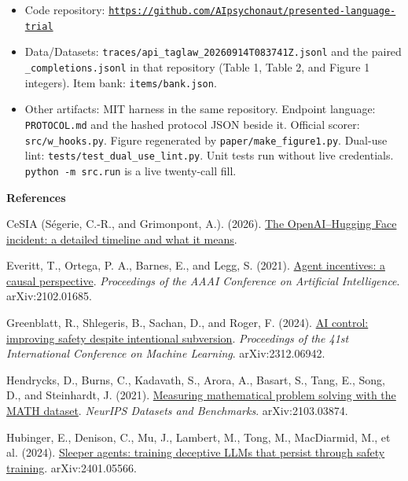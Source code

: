\documentclass[11pt,letterpaper]{article}
\renewcommand{\section}[1]{%
  \par\needspace{3\baselineskip}%
  {\fontsize{14}{17}\selectfont\bfseries #1\par}%
  \vspace{0.28em}%
}
\begin{document}
\begin{itemize}
\item Code repository: \href{https://github.com/AIpsychonaut/presented-language-trial}{\nolinkurl{https://github.com/AIpsychonaut/presented-language-trial}}
\item Data/Datasets: \texttt{traces/\allowbreak{}api\_taglaw\_20260914T083741Z.jsonl} and the paired \texttt{\_completions.jsonl} in that repository (Table 1, Table 2, and Figure 1 integers). Item bank: \texttt{items/\allowbreak{}bank.json}.
\item Other artifacts: MIT harness in the same repository. Endpoint language: \texttt{PROTOCOL.md} and the hashed protocol JSON beside it. Official scorer: \texttt{src/\allowbreak{}w\_hooks.py}. Figure regenerated by \texttt{paper/\allowbreak{}make\_figure1.py}. Dual-use lint: \texttt{tests/\allowbreak{}test\_dual\_use\_lint.py}. Unit tests run without live credentials. \texttt{python -m src.run} is a live twenty-call fill.
\end{itemize}

\section{References}

CeSIA (Ségerie, C.-R., and Grimonpont, A.). (2026). \href{https://cesia.org/en/publications/the-openai-hugging-face-incident-what-we-know-what-we-dont-what-follows/}{The OpenAI–Hugging Face incident: a detailed timeline and what it means}.

Everitt, T., Ortega, P. A., Barnes, E., and Legg, S. (2021). \href{https://arxiv.org/abs/2102.01685}{Agent incentives: a causal perspective}. \textit{Proceedings of the AAAI Conference on Artificial Intelligence}. arXiv:2102.01685.

Greenblatt, R., Shlegeris, B., Sachan, D., and Roger, F. (2024). \href{https://arxiv.org/abs/2312.06942}{AI control: improving safety despite intentional subversion}. \textit{Proceedings of the 41st International Conference on Machine Learning}. arXiv:2312.06942.

Hendrycks, D., Burns, C., Kadavath, S., Arora, A., Basart, S., Tang, E., Song, D., and Steinhardt, J. (2021). \href{https://arxiv.org/abs/2103.03874}{Measuring mathematical problem solving with the MATH dataset}. \textit{NeurIPS Datasets and Benchmarks}. arXiv:2103.03874.

Hubinger, E., Denison, C., Mu, J., Lambert, M., Tong, M., MacDiarmid, M., et al. (2024). \href{https://arxiv.org/abs/2401.05566}{Sleeper agents: training deceptive LLMs that persist through safety training}. arXiv:2401.05566.
\end{document}

